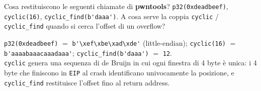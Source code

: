 \question[6]
Cosa restituiscono le seguenti chiamate di \textbf{pwntools}?
\lstinline|p32(0xdeadbeef)|, \lstinline|cyclic(16)|, \lstinline|cyclic_find(b'daaa')|.
A cosa serve la coppia \lstinline|cyclic| / \lstinline|cyclic_find| quando si cerca l'offset di un overflow?
\begin{solution}
\lstinline|p32(0xdeadbeef)| $=$ \lstinline|b'\xef\xbe\xad\xde'| (little-endian); \lstinline|cyclic(16)| $=$ \lstinline|b'aaaabaaacaaadaaa'|; \lstinline|cyclic_find(b'daaa')| $=$ \lstinline|12|.\\
\lstinline|cyclic| genera una sequenza di de Bruijn in cui ogni finestra di 4 byte è unica: i 4 byte che finiscono in \lstinline|EIP| al crash identificano univocamente la posizione, e \lstinline|cyclic_find| restituisce l'offset fino al return address.
\end{solution}
